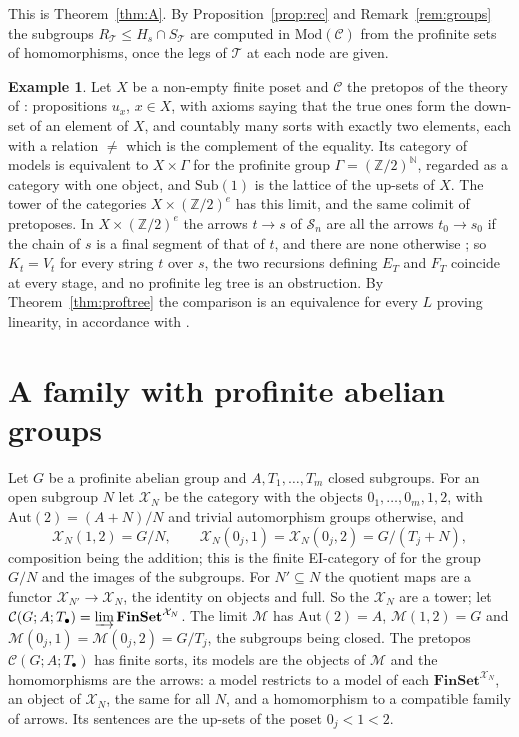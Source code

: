 \documentclass[11pt]{amsart}
\theoremstyle{definition}
\newtheorem{ex}[thm]{Example}
\newcommand{\Fin}{\mathbf{FinSet}}
\newcommand{\Sub}{\mathrm{Sub}}
\newcommand{\Mod}{\mathrm{Mod}}
\newcommand{\Aut}{\mathrm{Aut}}
\newcommand{\cX}{\mathcal X}
\newcommand{\cC}{\mathcal C}
\newcommand{\cM}{\mathcal M}
\newcommand{\cS}{\mathcal S}
\begin{document}
This is Theorem~\ref{thm:A}. By Proposition~\ref{prop:rec} and
Remark~\ref{rem:groups} the subgroups $R_{\mathcal T}\le H_s\cap
S_{\mathcal T}$ are computed in $\Mod(\cC)$ from the profinite sets of
homomorphisms, once the legs of $\mathcal T$ at each node are given.

\begin{ex}\label{ex:product}
Let $X$ be a non-empty finite poset and $\cC$ the pretopos of the
theory of \cite[Ex.~7.3]{Finsorts}: propositions $u_x$, $x\in X$, with
axioms saying that the true ones form the down-set of an element of
$X$, and countably many sorts with exactly two elements, each with a
relation $\ne$ which is the complement of the equality.
Its category of models is equivalent to $X\times\Gamma$ for the
profinite group $\Gamma=(\mathbb Z/2)^{\mathbb N}$, regarded as a
category with one object, and $\Sub(1)$ is the lattice of the up-sets
of $X$. The tower of the categories $X\times(\mathbb Z/2)^e$ has this
limit, and the same colimit of pretoposes. In $X\times(\mathbb
Z/2)^e$ the arrows $t\to s$ of $\cS_n$ are all the arrows $t_0\to
s_0$ if the chain of $s$ is a final segment of that of $t$, and there
are none otherwise \cite[proof of Cor.~6.2]{Strings}; so $K_t=V_t$ for
every string $t$ over $s$, the two recursions defining $E_T$ and
$F_T$ coincide at every stage, and no profinite leg tree is an
obstruction. By Theorem~\ref{thm:proftree} the comparison is an
equivalence for every $L$ proving linearity, in accordance with
\cite[Ex.~7.3]{Finsorts}.
\end{ex}

\section{A family with profinite abelian groups}\label{sec:three}

Let $G$ be a profinite abelian group and $A,T_1,\dots,T_m$ closed
subgroups. For an open subgroup $N$ let $\cX_N$ be the category with
the objects $0_1,\dots,0_m,1,2$, with $\Aut(2)=(A+N)/N$ and trivial
automorphism groups otherwise, and
\[
\cX_N(1,2)=G/N,\qquad\cX_N(0_j,1)=\cX_N(0_j,2)=G/(T_j+N),
\]
composition being the addition; this is the finite EI-category of
\cite[Prop.~6.11]{Strings} for the group $G/N$ and the images of the
subgroups. For $N'\subseteq N$ the quotient maps are a functor
$\cX_{N'}\to\cX_N$, the identity on objects and full. So the $\cX_N$
are a tower; let $\cC(G;A;T_\bullet)=\varinjlim\Fin^{\cX_N}$. The limit
$\cM$ has $\Aut(2)=A$, $\cM(1,2)=G$ and $\cM(0_j,1)=\cM(0_j,2)=G/T_j$,
the subgroups being closed. The pretopos $\cC(G;A;T_\bullet)$ has
finite sorts, its models are the objects of $\cM$ and the
homomorphisms are the arrows: a model restricts to a model of each
$\Fin^{\cX_N}$, an object of $\cX_N$, the same for all $N$, and a
homomorphism to a compatible family of arrows. Its sentences are the
up-sets of the poset $0_j<1<2$.
\end{document}
